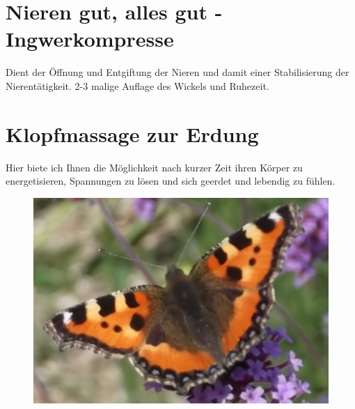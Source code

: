 \documentclass[10pt,foldmark,notumble]{leaflet}
\begin{document}
\section{Nieren gut, alles gut - Ingwerkompresse}
Dient der Öffnung und Entgiftung der Nieren und damit einer Stabilisierung der Nierentätigkeit. 2-3 malige Auflage des Wickels und Ruhezeit. 
\section{Klopfmassage zur Erdung}
Hier biete ich Ihnen die Möglichkeit nach kurzer Zeit ihren Körper zu energetisieren, Spannungen zu lösen und sich geerdet und lebendig zu fühlen. 
\begin{figure}[h] %
\begin{center}
 \includegraphics [scale=.25]{Schmetterling3.JPG}
 \end{center}
 \end{figure}
\newpage
\end{document}
